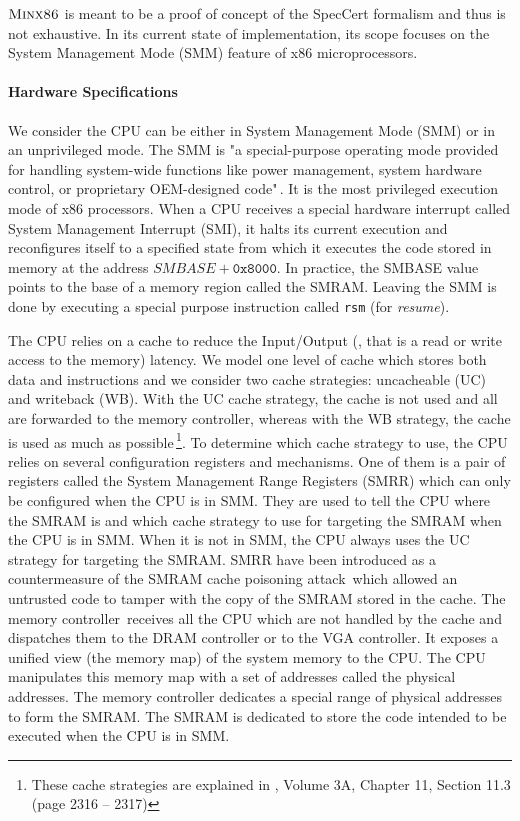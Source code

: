 $\textsc{Minx86}$ is meant to be a proof of concept of the SpecCert formalism
and thus is not exhaustive. In its current state of implementation, its scope
focuses on the System Management Mode (SMM) feature of x86 microprocessors.

\paragraph{Hardware Specifications}
We consider the CPU can be either in System Management Mode (SMM) or in an
unprivileged mode. The SMM is "a special-purpose operating mode provided for
handling system-wide functions like power management, system hardware control,
or proprietary OEM-designed code"\,\cite{intel2014manual}. It is the most privileged
execution mode of x86 processors.  When a CPU receives a special hardware
interrupt called System Management Interrupt (SMI), it halts its current
execution and reconfigures itself to a specified state from which it executes
the code stored in memory at the address $SMBASE + \texttt{0x8000}$. In
practice, the SMBASE value points to the base of a memory region called the
SMRAM. Leaving the SMM is done by executing a special purpose instruction called
\texttt{rsm} (for \emph{resume}).

The CPU relies on a cache to reduce the Input/Output (\IO, that is a read or
write access to the memory) latency. We model one level of cache which stores
both data and instructions and we consider two cache strategies: uncacheable
(UC) and writeback (WB). With the UC cache strategy, the cache is not used and
all \IOs are forwarded to the memory controller, whereas with the WB strategy,
the cache is used as much as possible\,\footnote{These cache strategies are
explained in \cite{intel2014manual}, Volume 3A, Chapter 11, Section 11.3 (page 2316 --
2317)}. To determine which cache strategy to use, the CPU relies on several
configuration registers and mechanisms. One of them is a pair of registers
called the System Management Range Registers (SMRR) which can only be configured
when the CPU is in SMM. They are used to tell the CPU where the SMRAM is and
which cache strategy to use for \IO targeting the SMRAM when the CPU is in SMM.
When it is not in SMM, the CPU always uses the UC strategy for \IO targeting the
SMRAM. SMRR have been introduced as a countermeasure of the SMRAM cache
poisoning attack\,\cite{wojtczuk2009smram,duflot2009smram} which allowed an
untrusted code to tamper with the copy of the SMRAM stored in the cache.  The
memory controller\,\cite{intel2009mch} receives all the CPU \IOs which are not
handled by the cache and dispatches them to the DRAM controller or to the VGA
controller. It exposes a unified view (the memory map) of the system memory to
the CPU. The CPU manipulates this memory map with a set of addresses called the
physical addresses. The memory controller dedicates a special range of physical
addresses to form the SMRAM. The SMRAM is dedicated to store the code intended
to be executed when the CPU is in SMM.

